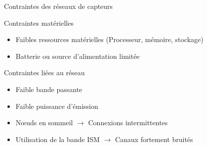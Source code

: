 \begin{frame}{Contraintes des réseaux de capteurs}

  \begin{block}{Contraintes matérielles}
    \begin{itemize}
      \item Faibles ressources matérielles (Processeur, mémoire, stockage)
      \item Batterie ou source d'alimentation limitée
    \end{itemize}
  \end{block}  

  \begin{block}{Contraintes liées au réseau}
    \begin{itemize}
      \item Faible bande passante
      \item Faible puissance d'émission
      \item Nœuds en sommeil $\to$ Connexions intermittentes
      \item Utilisation de la bande ISM $\to$ Canaux fortement bruités
    \end{itemize}
  \end{block}

\end{frame}

